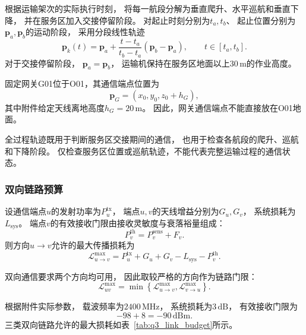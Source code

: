 \documentclass[bwprint]{gmcmthesis}
\begin{document}
根据运输架次的实际执行时刻，
将每一航段分解为垂直爬升、水平巡航和垂直下降，
并在服务区加入交接停留阶段。
对起止时刻分别为$t_a,t_b$、
起止位置分别为$\boldsymbol{p}_a,\boldsymbol{p}_b$的运动阶段，
采用分段线性轨迹
\begin{equation}
    \boldsymbol{p}_k(t)
    =
    \boldsymbol{p}_a
    +
    \frac{t-t_a}{t_b-t_a}
    \left(\boldsymbol{p}_b-\boldsymbol{p}_a\right),
    \qquad t\in[t_a,t_b].
    \label{eq:q3_trajectory}
\end{equation}
对于交接停留阶段，
$\boldsymbol{p}_a=\boldsymbol{p}_b$，
运输机保持在服务区地面以上$30\,\mathrm{m}$的作业高度。

固定网关G01位于O01，其通信端点位置为
\begin{equation}
    \boldsymbol{p}_{G}
    =
    (x_0,y_0,z_0+h_G),
\end{equation}
其中附件给定天线离地高度$h_G=20\,\mathrm{m}$。
因此，网关通信端点不能直接放在O01地面。

全过程轨迹既用于判断服务区交接期间的通信，
也用于检查各航段的爬升、巡航和下降阶段。
仅检查服务区位置或巡航轨迹，不能代表完整运输过程的通信状态。

\subsubsection{双向链路预算}

设通信端点$u$的发射功率为$P_u^{\mathrm{tx}}$，
端点$u,v$的天线增益分别为$G_u,G_v$，
系统损耗为$L_{\mathrm{sys}}$。
端点$v$的有效接收门限由接收灵敏度与衰落裕量组成：
\begin{equation}
    P_v^{\mathrm{th}}
    =
    P_v^{\mathrm{sens}}+F_v.
\end{equation}
则方向$u\to v$允许的最大传播损耗为
\begin{equation}
    \mathcal{L}_{u\to v}^{\max}
    =
    P_u^{\mathrm{tx}}
    +G_u+G_v
    -L_{\mathrm{sys}}
    -P_v^{\mathrm{th}}.
\end{equation}

双向通信要求两个方向均可用，
因此取较严格的方向作为链路门限：
\begin{equation}
    \mathcal{L}_{uv}^{\max}
    =
    \min\left\{
    \mathcal{L}_{u\to v}^{\max},
    \mathcal{L}_{v\to u}^{\max}
    \right\}.
    \label{eq:q3_bidirectional_budget}
\end{equation}

根据附件实际参数，
载波频率为$2400\,\mathrm{MHz}$，
系统损耗为$3\,\mathrm{dB}$，
有效接收门限为
\begin{equation}
    -98+8=-90\,\mathrm{dBm}.
\end{equation}
三类双向链路允许的最大损耗如表~\ref{tab:q3_link_budget}所示。
\end{document}
